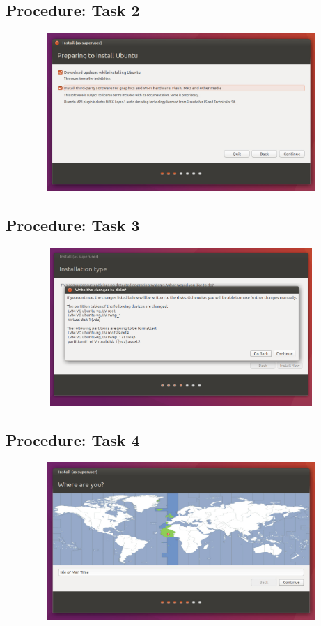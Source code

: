 \documentclass[11pt]{article}            %
\begin{document}
\subsection{Procedure: Task 2}     
\centering
  \includegraphics[width=24cm,height=6cm,keepaspectratio]{four.png}

\subsection{Procedure: Task 3}     
\centering
  \includegraphics[width=24cm,height=6cm,keepaspectratio]{nine.png}

\subsection{Procedure: Task 4}     
\centering
  \includegraphics[width=24cm,height=6cm,keepaspectratio]{two.png}
\end{document}
